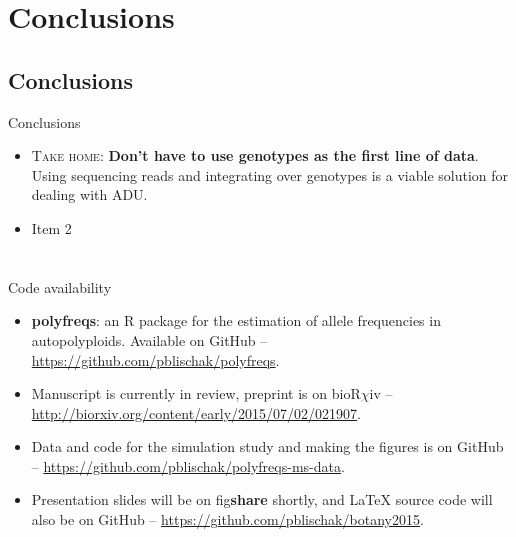 \documentclass[presentation]{beamer}
\begin{document}
\section{Conclusions}

\subsection*{Conclusions}

\begin{frame}[t]{Conclusions}
	\fontsize{10pt}{10}\selectfont
	\begin{itemize}
		\item \textsc{Take home}: \textbf{Don't have to use genotypes as the first line of data}. Using sequencing reads and integrating over genotypes is a viable solution for dealing with ADU.
		\vspace{0.2in}
	
		\item Item 2
		\vspace{0.2in}
		
	\end{itemize}
	
\end{frame}

\section*{}

\begin{frame}[t,plain]{Code availability}
	\fontsize{10pt}{10}\selectfont
	\begin{itemize}
		\item \textbf{polyfreqs}: an R package for the estimation of allele frequencies in autopolyploids. Available on GitHub -- \url{https://github.com/pblischak/polyfreqs}.
		\vspace{0.2in}
		
		\item Manuscript is currently in review, preprint is on bioR$\chi$iv -- \url{http://biorxiv.org/content/early/2015/07/02/021907}.
		\vspace{0.2in}
	
		\item Data and code for the simulation study and making the figures is on GitHub -- \url{https://github.com/pblischak/polyfreqs-ms-data}.
		\vspace{0.2in}
	
		\item Presentation slides will be on fig\textbf{share} shortly, and \LaTeX{} source code will also be on GitHub -- \url{https://github.com/pblischak/botany2015}.
	\end{itemize}
\end{frame}
\end{document}
